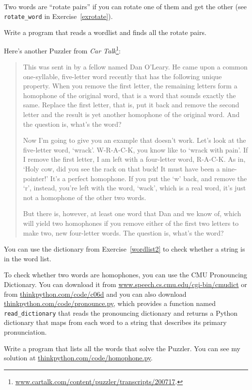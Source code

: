 \begin{exercise}
\label{exrotatepairs}


Two words are ``rotate pairs'' if you can rotate one of them
and get the other {\color{red} (see \verb"rotate_word" in Exercise~\ref{exrotate})}.

Write a program that reads a wordlist and finds all the rotate
pairs.
\end{exercise}


\begin{exercise}

Here's another Puzzler from {\em Car
Talk}\footnote{\url{www.cartalk.com/content/puzzler/transcripts/200717}.}:

\begin{quote}
This was sent in by a fellow named Dan O'Leary. He came upon a common
one-syllable, five-letter word recently that has the following unique
property. When you remove the first letter, the remaining letters form
a homophone of the original word, that is a word that sounds exactly
the same. Replace the first letter, that is, put it back and remove
the second letter and the result is yet another homophone of the
original word. And the question is, what's the word?

Now I'm going to give you an example that doesn't work. Let's look at
the five-letter word, `wrack'. W-R-A-C-K, you know like to `wrack with
pain'. If I remove the first letter, I am left with a four-letter
word, R-A-C-K. As in, `Holy cow, did you see the rack on that buck!
It must have been a nine-pointer!' It's a perfect homophone. If you
put the `w' back, and remove the `r', instead, you're left with the
word, `wack', which is a real word, it's just not a homophone of the
other two words.

But there is, however, at least one word that Dan and we know of,
which will yield two homophones if you remove either of the first two
letters to make two, new four-letter words. The question is, what's
the word?
\end{quote}


You can use the dictionary from {\color{red} Exercise~\ref{wordlist2}} to check
whether a string is in the word list.

To check whether two words are homophones, you can use the CMU
Pronouncing Dictionary.  You can download it from
\url{www.speech.cs.cmu.edu/cgi-bin/cmudict} or from
\url{thinkpython.com/code/c06d} and you can also download
\url{thinkpython.com/code/pronounce.py}, which provides a function
named \verb"read_dictionary" that reads the pronouncing dictionary and
returns a Python dictionary that maps from each word to a string that
describes its primary pronunciation.

Write a program that lists all the words that solve the Puzzler.
You can see my solution at \url{thinkpython.com/code/homophone.py}.

\end{exercise}

